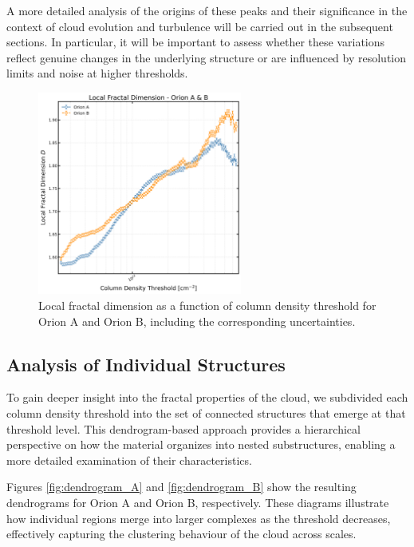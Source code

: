 A more detailed analysis of the origins of these peaks and their significance in the context of cloud evolution and turbulence will be carried out in the subsequent sections. In particular, it will be important to assess whether these variations reflect genuine changes in the underlying structure or are influenced by resolution limits and noise at higher thresholds.

\begin{figure}[t]
    \centering
    \includegraphics[width=0.6\textwidth]{figures/local_orion_A_B.png}
    \caption{Local fractal dimension as a function of column density threshold for Orion A and Orion B, including the corresponding uncertainties.}
    \label{fig:local_Orion_A_B}
\end{figure}

\subsection{Analysis of Individual Structures}

To gain deeper insight into the fractal properties of the cloud, we subdivided each column density threshold into the set of connected structures that emerge at that threshold level. This dendrogram-based approach provides a hierarchical perspective on how the material organizes into nested substructures, enabling a more detailed examination of their characteristics.

Figures \ref{fig:dendrogram_A} and \ref{fig:dendrogram_B} show the resulting dendrograms for Orion A and Orion B, respectively. These diagrams illustrate how individual regions merge into larger complexes as the threshold decreases, effectively capturing the clustering behaviour of the cloud across scales.

